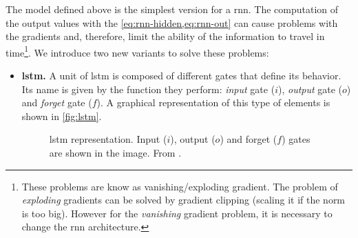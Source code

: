 The model defined above is the simplest version for a \gls{rnn}. The
computation of the output values with the \vref{eq:rnn-hidden,eq:rnn-out} can
cause problems with the gradients and, therefore, limit the ability of the
information to travel in time\footnote{These problems are know as
  vanishing/exploding gradient. The problem of \emph{exploding} gradients can
  be solved by gradient clipping (scaling it if the norm is too big). However
  for the \emph{vanishing} gradient problem, it is necessary to change the
  \gls{rnn} architecture.}. We introduce two new variants to solve these
problems:
\begin{itemize}
  \item \textbf{\gls*{lstm}.} A unit of \gls{lstm} is composed of different
  gates that define its behavior. Its name is given by the function they
  perform: \emph{input} gate (\(i\)), \emph{output} gate (\(o\)) and
  \emph{forget} gate (\(f\)). A graphical representation of this type of
  elements is shown in \vref{fig:lstm}.
  \begin{figure}[ht]
    \centering
    
    \caption[]{\acf{lstm} representation. Input (\(i\)),
      output (\(o\)) and forget (\(f\)) gates are shown in the image. From
      .}\label{fig:lstm}
  \end{figure}


\end{itemize}
